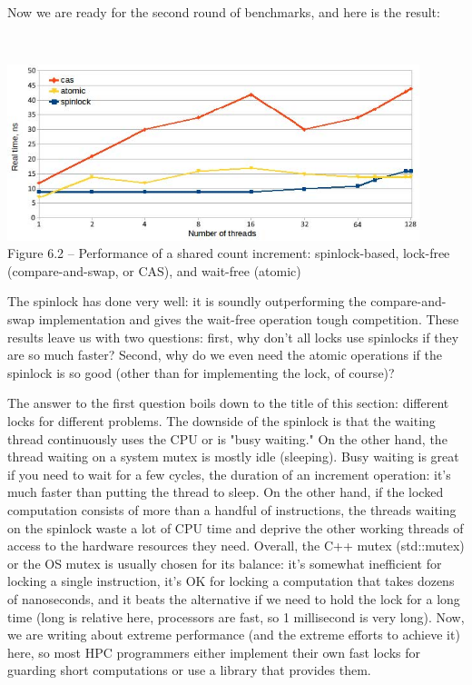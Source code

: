Now we are ready for the second round of benchmarks, and here is the result:

\hspace*{\fill} \\ %
\begin{center}
\includegraphics[width=0.9\textwidth]{content/2/chapter6/images/2.jpg}\\
Figure 6.2 – Performance of a shared count increment: spinlock-based, lock-free (compare-and-swap, or CAS), and wait-free (atomic)
\end{center}

The spinlock has done very well: it is soundly outperforming the compare-and-swap implementation and gives the wait-free operation tough competition. These results leave us with two questions: first, why don't all locks use spinlocks if they are so much faster? Second, why do we even need the atomic operations if the spinlock is so good (other than for implementing the lock, of course)?

The answer to the first question boils down to the title of this section: different locks for different problems. The downside of the spinlock is that the waiting thread continuously uses the CPU or is "busy waiting." On the other hand, the thread waiting on a system mutex is mostly idle (sleeping). Busy waiting is great if you need to wait for a few cycles, the duration of an increment operation: it's much faster than putting the thread to sleep. On the other hand, if the locked computation consists of more than a handful of instructions, the threads waiting on the spinlock waste a lot of CPU time and deprive the other working threads of access to the hardware resources they need. Overall, the C++ mutex (std::mutex) or the OS mutex is usually chosen for its balance: it's somewhat inefficient for locking a single instruction, it's OK for locking a computation that takes dozens of nanoseconds, and it beats the alternative if we need to hold the lock for a long time (long is relative here, processors are fast, so 1 millisecond is very long). Now, we are writing about extreme performance (and the extreme efforts to achieve it) here, so most HPC programmers either implement their own fast locks for guarding short computations or use a library that provides them. 

